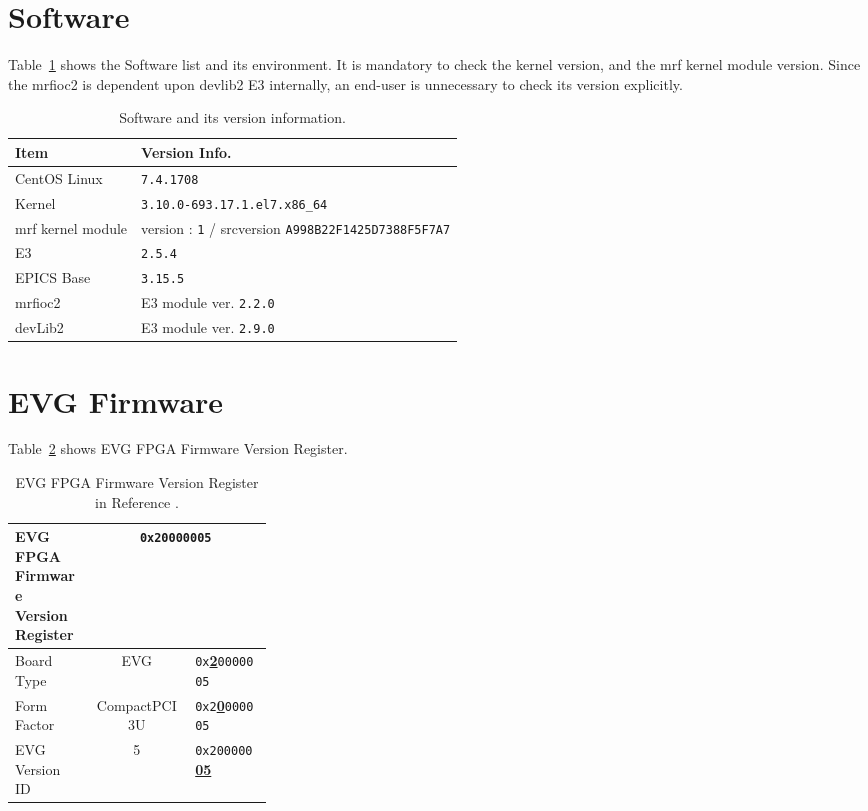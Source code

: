 \documentclass[11pt
  , a4paper
  , article
  , oneside
  , showtrims
]{memoir}
\begin{document}
\section{Software}
Table~\ref{table:swlist} shows the Software list and its environment. It is mandatory to check the kernel version, and the mrf kernel module version. Since the mrfioc2 is dependent upon devlib2 E3 internally, an end-user is unnecessary to check its version explicitly.
\begin{table}[!htb]
  \centering
  \begin{tabular}{l|l}
    \toprule
    Item               & Version Info.                                                      \\\midrule
    CentOS Linux       & \texttt{7.4.1708}                                                  \\\midrule
    Kernel             & \texttt{3.10.0-693.17.1.el7.x86\_64}                               \\\midrule
    mrf kernel module  & version : \texttt{1} / srcversion \texttt{A998B22F1425D7388F5F7A7} \\\midrule
    E3                 & \texttt{2.5.4}                                                     \\\midrule
    EPICS Base         & \texttt{3.15.5}                                                    \\\midrule
    mrfioc2            & E3 module ver. \texttt{2.2.0}                                      \\\midrule
    devLib2            & E3 module ver. \texttt{2.9.0}                                      \\\bottomrule
  \end{tabular}
  \caption[]{Software and its version information.}
  \label{table:swlist}
\end{table}

\section{EVG Firmware}
Table~\ref{table:fwinfo} shows EVG FPGA Firmware Version Register.

\begin{table}[!htb]
  \centering
  \begin{tabular}{p{0.3\linewidth}|c|l}
    \toprule
    EVG FPGA Firmware Version Register            & \multicolumn{2}{c}{\texttt{0x20000005}}             \\\midrule
    Board Type      & EVG                         &  \texttt{0x}\underline{\textbf{2}}\texttt{0000005}  \\\midrule
    Form Factor     & CompactPCI 3U               &  \texttt{0x2}\underline{\textbf{0}}\texttt{000005}  \\\midrule
    EVG Version ID  & 5                           &  \texttt{0x200000}\underline{\textbf{05}}           \\\bottomrule
  \end{tabular}
  \caption[]{EVG FPGA Firmware Version Register in Reference \citep[see][p32]{MRFEVENTGENERATOR}.}
  \label{table:fwinfo}
\end{table}
\end{document}
